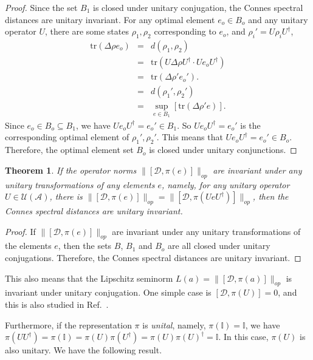 \documentclass[a4paper,12pt]{article}
\newtheorem{theorem}{Theorem}
\begin{document}
\begin{proof}Since the set $B_1$ is closed under unitary
conjugation, the Connes spectral distances are unitary invariant. For any
optimal element $e_o \in B_o$ and any unitary operator $U$, there are some
states $\rho_1, \rho_2$ corresponding to $e_o$, and $\rho_i' = U \rho_i
U^{\dag}$,
\begin{eqnarray}
  \mathrm{tr} (\Delta \rho e_o) & = & d (\rho_1, \rho_2) \nonumber\\
  & = & \mathrm{tr} (U \Delta \rho U^{\dag} \cdot Ue_o U^{\dag}) \nonumber\\
  & = & \mathrm{tr} (\Delta \rho' e_o') . \nonumber\\
  & = & d (\rho_1', \rho_2') \nonumber\\
  & = & \sup_{e \in B_1} [\mathrm{tr} (\Delta \rho' e)] . 
\end{eqnarray}
Since $e_o \in B_o \subseteq B_1$, we have $Ue_o U^{\dag} = e_o' \in B_1$. So
$Ue_o U^{\dag} = e_o'$ is the corresponding optimal element of $\rho_1',
\rho_2'$. This means that $Ue_o U^{\dag} = e_o' \in B_o$. Therefore, the
optimal element set $B_o$ is closed under unitary
conjunctions.
\end{proof}

\begin{theorem}\label{lu}
  If the operator norms $\|[\mathcal{D}, \pi (e)]\|_{op}$ are invariant under
  any unitary transformations of any elements $e$, namely, for any unitary
  operator $U \in \mathcal{U} (\mathcal{A})$, there is $\|[\mathcal{D}, \pi
  (e)]\|_{op} = \|[\mathcal{D}, \pi (UeU^{\dag})]\|_{op}$, then the Connes
  spectral distances are unitary invariant.
\end{theorem}

\begin{proof}If $\|[\mathcal{D}, \pi (e)]\|_{op}$ are invariant
under any unitary transformations of the elements $e$, then the sets $B$,
$B_1$ and $B_o$ are all closed under unitary conjugations. Therefore, the
Connes spectral distances are unitary invariant.
\end{proof}

This also means that the Lipschitz seminorm $L (a) = \|[\mathcal{D}, \pi
(a)]\|_{op}$ is invariant under unitary conjugation.
One simple case is $[\mathcal{D}, \pi (U)]=0$, and this is also studied in Ref.~\cite{Martinettip}.

Furthermore, if the representation $\pi$ is \textit{unital}, namely,
$\pi (\mathbb{I}) =\mathbb{I}$, we have $\pi (UU^{\dag}) = \pi (\mathbb{I}) =
\pi (U) \pi (U^{\dag}) = \pi (U) \pi (U)^{\dag} =\mathbb{I}$. In this case,
$\pi (U)$ is also unitary. We have the following result.
\end{document}
